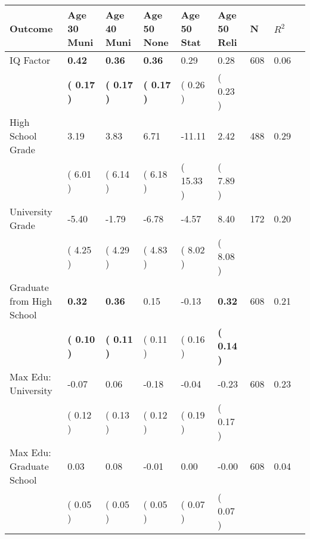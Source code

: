 \begin{tabular}{L{6.2cm} C{1.8cm} C{1.8cm} C{1.8cm} C{1.8cm} C{1.8cm} C{1.8cm} C{0.3cm} C{0.3cm}}
\toprule
 \textbf{Outcome} & \textbf{Age 30 Muni} & \textbf{Age 40 Muni} & \textbf{Age 50 None} & \textbf{Age 50 Stat} & \textbf{Age 50 Reli} & \textbf{N} & \textbf{$ R^2$} \\
\midrule
IQ Factor & \textbf{     0.42} & \textbf{     0.36} & \textbf{     0.36} &      0.29 &      0.28  & 608 &       0.06 \\ 
 & \textbf{(     0.17 )} & \textbf{(     0.17 )} & \textbf{(     0.17 )} & (     0.26 ) & (     0.23 )  & \\
High School Grade &      3.19 &      3.83 &      6.71 &    -11.11 &      2.42  & 488 &       0.29 \\ 
 & (     6.01 ) & (     6.14 ) & (     6.18 ) & (    15.33 ) & (     7.89 )  & \\
University Grade &     -5.40 &     -1.79 &     -6.78 &     -4.57 &      8.40  & 172 &       0.20 \\ 
 & (     4.25 ) & (     4.29 ) & (     4.83 ) & (     8.02 ) & (     8.08 )  & \\
Graduate from High School & \textbf{     0.32} & \textbf{     0.36} &      0.15 &     -0.13 & \textbf{     0.32}  & 608 &       0.21 \\ 
 & \textbf{(     0.10 )} & \textbf{(     0.11 )} & (     0.11 ) & (     0.16 ) & \textbf{(     0.14 )}  & \\
Max Edu: University &     -0.07 &      0.06 &     -0.18 &     -0.04 &     -0.23  & 608 &       0.23 \\ 
 & (     0.12 ) & (     0.13 ) & (     0.12 ) & (     0.19 ) & (     0.17 )  & \\
Max Edu: Graduate School &      0.03 &      0.08 &     -0.01 &      0.00 &     -0.00  & 608 &       0.04 \\ 
 & (     0.05 ) & (     0.05 ) & (     0.05 ) & (     0.07 ) & (     0.07 )  & \\
\bottomrule
\end{tabular}
